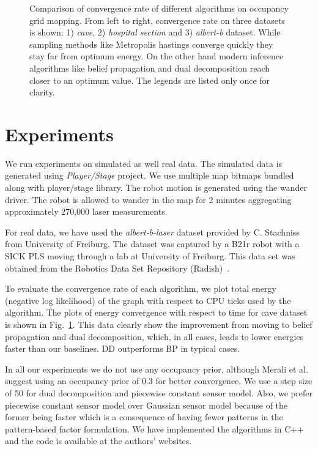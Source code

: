\documentclass[letterpaper, 10 pt, conference]{ieeeconf} %
\begin{document}
\begin{figure}
  \caption{Comparison of convergence rate of different algorithms on occupancy
    grid mapping. From left to right, convergence rate on three datasets is 
    shown: 1) \emph{cave}, 2) \emph{hospital section} and 3) \emph{albert-b}
    \cite{howard2003radish} dataset.  While sampling methods like Metropolis
    hastings converge quickly they stay far from optimum energy.  On the other
    hand modern inference algorithms like belief propagation and dual
    decomposition reach closer to an optimum value. The legends are listed
    only once for clarity.
  }
  \label{fig:convergence-comparison}
\end{figure}
\section{Experiments} 
We run experiments on simulated as well real data.
The simulated data is generated using \emph{Player/Stage} \cite{gerkey2003player}
project. We use multiple map bitmaps bundled along with player/stage library.
The robot motion is generated using the wander driver. The robot is allowed to
wander in the map for 2 minutes aggregating approximately 270,000 laser measurements.

For real data, we have used the \emph{albert-b-laser} dataset provided by
C. Stachniss from University of Freiburg. The dataset was captured by a
B21r robot with a SICK PLS moving through a lab at University of Freiburg.
This data set was obtained from the Robotics Data Set Repository
(Radish)~\cite{howard2003radish}.

To evaluate the convergence rate of each algorithm, we plot total energy
(negative log likelihood) of the graph with respect to CPU ticks used by the
algorithm. The plots of energy convergence with respect to time for cave
dataset is shown in Fig.~\ref{fig:convergence-comparison}. This data clearly
show the improvement from moving to belief propagation and dual decomposition,
which, in all cases, leads to lower energies faster than our baselines.  DD
outperforms BP in typical cases.

In all our experiments we do not use any occupancy prior, although Merali et
al. \cite{merali2013icra} suggest using an occupancy prior of 0.3 for better
convergence. We use a step size of 50 for dual decomposition and piecewise
constant sensor model. Also, we prefer piecewise constant sensor model over
Gaussian sensor model because of the former being faster which is a consequence
of having fewer patterns in the pattern-based factor formulation.
We have implemented the algorithms in C++ and the code is available at the 
authors' websites.
\end{document}
